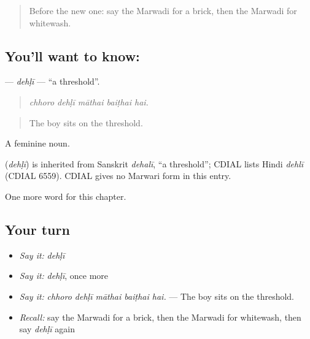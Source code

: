 \label{lesson:MW-C189-dehli}



\begin{quote}
Before the new one: say the Marwadi for a brick, then the Marwadi for whitewash.
\end{quote}

\subsection*{You'll want to know: }
\textbf{} — \emph{dehḷī} — \textquotedblleft{}a threshold\textquotedblright{}.

\begin{quote}
    
\end{quote}

\begin{quote}
\emph{chhoro dehḷī māthai baiṭhai hai.}
\end{quote}

\begin{quote}
The boy sits on the threshold.
\end{quote}

A feminine noun.

\begin{cousinweb}
\textbf{} (\emph{dehḷī}) is inherited from Sanskrit \emph{dehalī}, \textquotedblleft{}a threshold\textquotedblright{}; CDIAL lists Hindi \emph{dehlī} (CDIAL 6559). CDIAL gives no Marwari form in this entry.
\end{cousinweb}

\begin{grammarlens}[title={What you've built}]
One more word for this chapter.
\end{grammarlens}

\subsection*{Your turn}
\begin{itemize}
\raggedright
  \item \emph{Say it:} \emph{dehḷī}
  \item \emph{Say it:} \emph{dehḷī}, once more
  \item \emph{Say it:} \emph{chhoro dehḷī māthai baiṭhai hai.} — The boy sits on the threshold.
  \item \emph{Recall:} say the Marwadi for a brick, then the Marwadi for whitewash, then say \emph{dehḷī} again
\end{itemize}


